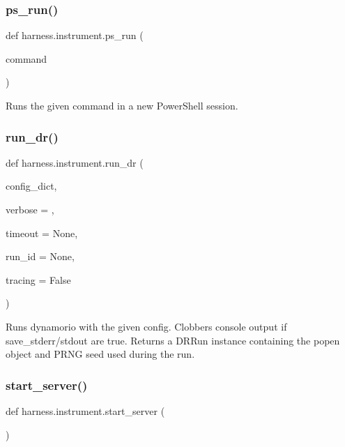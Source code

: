 \subsubsection{\texorpdfstring{ps\+\_\+run()}{ps\_run()}}
{\footnotesize\ttfamily def harness.\+instrument.\+ps\+\_\+run (\begin{DoxyParamCaption}\item[{}]{command }\end{DoxyParamCaption})}

\begin{DoxyVerb}Runs the given command in a new PowerShell session.
\end{DoxyVerb}
 \mbox{\label{namespaceharness_1_1instrument_a486d30f5beb02c7c2c8ec8c354641e7d}} 
\subsubsection{\texorpdfstring{run\+\_\+dr()}{run\_dr()}}
{\footnotesize\ttfamily def harness.\+instrument.\+run\+\_\+dr (\begin{DoxyParamCaption}\item[{}]{config\+\_\+dict,  }\item[{}]{verbose = {},  }\item[{}]{timeout = {\ttfamily None},  }\item[{}]{run\+\_\+id = {\ttfamily None},  }\item[{}]{tracing = {\ttfamily False} }\end{DoxyParamCaption})}

\begin{DoxyVerb}Runs dynamorio with the given config.
Clobbers console output if save_stderr/stdout are true.
Returns a DRRun instance containing the popen object and PRNG seed
used during the run.
\end{DoxyVerb}
 \mbox{\label{namespaceharness_1_1instrument_adef55a7d4ac78f33cd8b5d58abd85526}} 
\subsubsection{\texorpdfstring{start\+\_\+server()}{start\_server()}}
{\footnotesize\ttfamily def harness.\+instrument.\+start\+\_\+server (\begin{DoxyParamCaption}{ }\end{DoxyParamCaption})}

